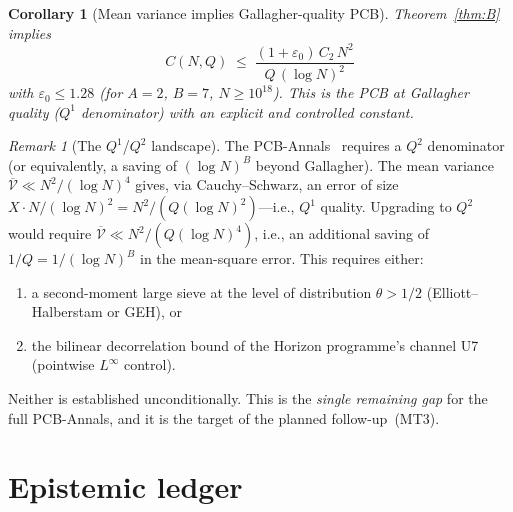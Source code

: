 \documentclass[11pt,reqno]{amsart}
\theoremstyle{plain}
\newtheorem{corollary}[theorem]{Corollary}
\theoremstyle{definition}
\theoremstyle{remark}
\newtheorem{remark}[theorem]{Remark}
\newcommand{\eps}{\varepsilon}
\begin{document}
\begin{corollary}[Mean variance implies Gallagher-quality PCB]\label{cor:weak_PCB}
Theorem~\ref{thm:B} implies
\[
  C(N,Q) \;\le\;
  \frac{(1+\eps_0)\, C_2\, N^2}{Q\,(\log N)^2}
\]
with $\eps_0 \le 1.28$ (for $A=2$, $B=7$, $N \ge 10^{18}$).
This is the PCB at Gallagher quality ($Q^1$ denominator) with
an explicit and controlled constant.
\end{corollary}

\begin{remark}[The $Q^1$/$Q^2$ landscape]\label{rem:gap}
The PCB-Annals~\cite{G37} requires a $Q^2$ denominator (or equivalently,
a saving of $(\log N)^B$ beyond Gallagher). The mean variance
$\overline{\mathcal{V}} \ll N^2/(\log N)^4$ gives, via
Cauchy--Schwarz, an error of size $X \cdot N/(\log N)^2
= N^2/(Q(\log N)^2)$---i.e., $Q^1$ quality.
Upgrading to $Q^2$ would require
$\overline{\mathcal{V}} \ll N^2/(Q(\log N)^4)$, i.e., an additional
saving of $1/Q = 1/(\log N)^B$ in the mean-square error.
This requires either:
\begin{enumerate}[label=(\alph*),nosep]
  \item a second-moment large sieve at the level of
    distribution $\theta > 1/2$ (Elliott--Halberstam or GEH), or
  \item the bilinear decorrelation bound of the Horizon programme's
    channel U7 (pointwise $L^{\infty}$ control).
\end{enumerate}
Neither is established unconditionally. This is the \emph{single
remaining gap} for the full PCB-Annals, and it is the target of
the planned follow-up~(MT3).
\end{remark}

\section{Epistemic ledger}\label{sec:ledger}
\end{document}
